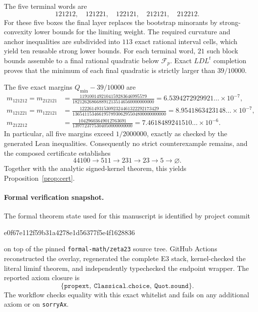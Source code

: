 \documentclass[11pt]{article}
\begin{document}
The five terminal words are
\[
121212,\quad121221,\quad122121,\quad212121,\quad212212.
\]
For these five boxes the final layer replaces the bootstrap minorants by
strong-convexity lower bounds for the limiting weight.  The required
curvature and anchor inequalities are subdivided into $113$ exact rational
interval cells, which yield ten reusable strong lower bounds.  For each
terminal word, $21$ such block bounds assemble to a final rational quadratic
below $\mathcal F_p$.  Exact $LDL^t$ completion proves that the minimum of
each final quadratic is strictly larger than $39/10000$.

The five exact margins $Q_{\min}-39/10000$ are
\[
\begin{aligned}
m_{121212}=m_{212121}
&=
\frac{1191001492104159283646995579}
     {1821262686688912135146560000000000}
 =6.5394272929921\ldots\times10^{-7},\\
m_{121221}=m_{122121}
&=
\frac{122261493153092324461322292173429}
     {136541153466195789306295504800000000000}
 =8.9541863423148\ldots\times10^{-7},\\
m_{212212}
&=
\frac{10429603649012763691}
     {1397723775304050000000000}
 =7.4618489241510\ldots\times10^{-6}.
\end{aligned}
\]
In particular, all five margins exceed $1/2000000$, exactly as checked by the
generated Lean inequalities.  Consequently no strict counterexample remains,
and the composed certificate establishes
\[
44100\longrightarrow511\longrightarrow231\longrightarrow23
\longrightarrow5\longrightarrow\varnothing.
\]
Together with the analytic signed-kernel theorem, this yields
Proposition~\ref{prop:cert}.

\paragraph{Formal verification snapshot.}
The formal theorem state used for this manuscript is identified by project
commit
\begin{center}
\small\ttfamily
e0f67e112f59b31a4278e1d56377f5e4f1628836
\end{center}
on top of the pinned \texttt{formal-math/zeta23} source tree.  GitHub Actions
reconstructed the overlay, regenerated the complete E3 stack, kernel-checked
the literal liminf theorem, and independently typechecked the endpoint wrapper.
The reported axiom closure is
\[
\{\texttt{propext},\ \texttt{Classical.choice},\ \texttt{Quot.sound}\}.
\]
The workflow checks equality with this exact whitelist and fails on any
additional axiom or on \texttt{sorryAx}.
\end{document}
